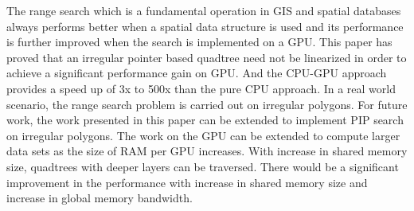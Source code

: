 
The range search which is a fundamental operation in GIS and spatial databases always performs better when a spatial data structure is used and its performance is further improved when the search is implemented on a GPU.
This paper has proved that an irregular pointer based quadtree  need not be linearized in order to achieve a significant performance gain on GPU. And the CPU-GPU approach provides a speed up of 3x to 500x than the pure CPU approach. 
In a real world scenario, the range search problem is carried out on irregular polygons. For future work,  the work presented in this paper can be extended to implement PIP search on irregular polygons. 
The work on the GPU can be extended to compute larger data sets as the size of RAM per GPU increases. With increase in shared memory size, quadtrees with deeper layers can be traversed. There would be a significant improvement in the performance with increase in shared memory size and increase in global memory bandwidth.







